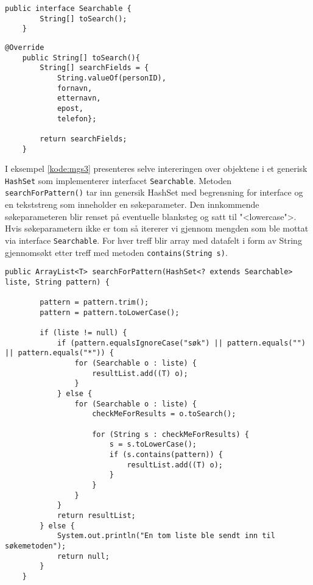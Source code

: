 \begin{lstlisting}[caption=Oversikt over \texttt{Searchable} interface, label=kode:mgs1]
	public interface Searchable {
   		String[] toSearch();
	}
\end{lstlisting}

\begin{lstlisting}[caption=Implemntasjon av metode \texttt{toSearch() i klassen Person.java}, label=kode:mgs2]
	@Override
    public String[] toSearch(){
        String[] searchFields = {
            String.valueOf(personID), 
            fornavn, 
            etternavn, 
            epost, 
            telefon};
        
        return searchFields;
    }
\end{lstlisting}

I eksempel \ref{kode:mgs3} presenteres selve intereringen over objektene i et generisk \texttt{HashSet} som implementerer interfacet \texttt{Searchable}. Metoden \texttt{searchForPattern()} tar inn genersik HashSet med begrensning for interface og en tekststreng som inneholder en søkeparameter. Den innkommende søkeparameteren blir renset på eventuelle blanksteg og satt til "<lowercase">. Hvis søkeparametern ikke er tom så itererer vi gjennom mengden som ble mottat via interface \texttt{Searchable}. For hver treff blir array med datafelt i form av String gjennomsøkt etter treff med metoden \texttt{contains(String s)}. 

\begin{lstlisting}[caption=Iterasjon over generisk \texttt{HashSet} som implementerer interface \texttt{Searchable}, label=kode:mgs3]
    public ArrayList<T> searchForPattern(HashSet<? extends Searchable> liste, String pattern) {

        pattern = pattern.trim();
        pattern = pattern.toLowerCase();

        if (liste != null) {
            if (pattern.equalsIgnoreCase("søk") || pattern.equals("") || pattern.equals("*")) {
                for (Searchable o : liste) {
                    resultList.add((T) o);
                }
            } else {
                for (Searchable o : liste) {
                    checkMeForResults = o.toSearch();

                    for (String s : checkMeForResults) {
                        s = s.toLowerCase();
                        if (s.contains(pattern)) {
                            resultList.add((T) o);
                        }
                    }
                }
            }
            return resultList;
        } else {
            System.out.println("En tom liste ble sendt inn til søkemetoden");
            return null;
        }
    }
\end{lstlisting}


